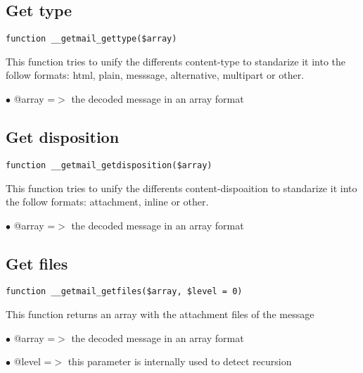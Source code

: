 \documentclass[a4paper]{book}
\begin{document}
\hypertarget{toc540}{}
\subsection{Get type}

\begin{lstlisting}
function __getmail_gettype($array)
\end{lstlisting}

This function tries to unify the differents content-type to standarize it into
the follow formats: html, plain, messsage, alternative, multipart or other.

\begin{compactitem}
\item[\color{myblue}$\bullet$] @array =$>$ the decoded message in an array format
\end{compactitem}

\hypertarget{toc541}{}
\subsection{Get disposition}

\begin{lstlisting}
function __getmail_getdisposition($array)
\end{lstlisting}

This function tries to unify the differents content-dispoaition to standarize
it into the follow formats: attachment, inline or other.

\begin{compactitem}
\item[\color{myblue}$\bullet$] @array =$>$ the decoded message in an array format
\end{compactitem}

\hypertarget{toc542}{}
\subsection{Get files}

\begin{lstlisting}
function __getmail_getfiles($array, $level = 0)
\end{lstlisting}

This function returns an array with the attachment files of the message

\begin{compactitem}
\item[\color{myblue}$\bullet$] @array =$>$ the decoded message in an array format
\item[\color{myblue}$\bullet$] @level =$>$ this parameter is internally used to detect recursion
\end{compactitem}
\end{document}
